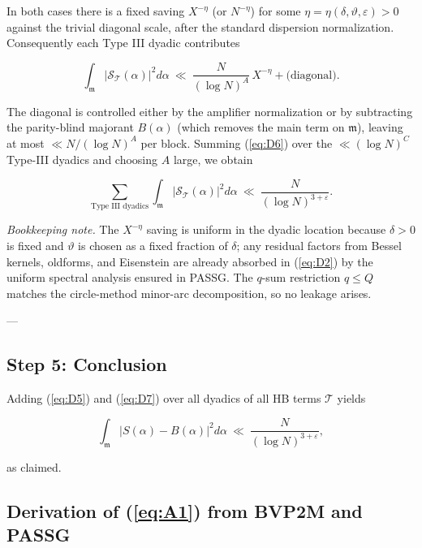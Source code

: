 \documentclass[11pt]{article}
\def\eqref#1{(\ref{#1})}%
\theoremstyle{definition}
\theoremstyle{remark}
\numberwithin{equation}{part}
\begin{document}
In both cases there is a fixed saving $X^{-\eta}$ (or $N^{-\eta}$) for some $\eta=\eta(\delta,\vartheta,\varepsilon)>0$ against the trivial diagonal scale, after the standard dispersion normalization. Consequently each Type III dyadic contributes

\begin{equation}\label{eq:D6}\int_{\mathfrak m}\big|\mathcal S_{\mathcal T}(\alpha)\big|^2 d\alpha\ \ll\ \frac{N}{(\log N)^{A}}\,X^{-\eta}+\text{(diagonal)}.\end{equation}

The diagonal is controlled either by the amplifier normalization or by subtracting the parity-blind majorant $B(\alpha)$ (which removes the main term on $\mathfrak m$), leaving at most $\ll N/(\log N)^A$ per block. Summing \eqref{eq:D6} over the $\ll(\log N)^C$ Type-III dyadics and choosing $A$ large, we obtain

\begin{equation}\label{eq:D7}\sum_{\text{Type III dyadics}}\int_{\mathfrak m}\big|\mathcal S_{\mathcal T}(\alpha)\big|^2 d\alpha\ \ll\ \frac{N}{(\log N)^{3+\varepsilon}}.\end{equation}

\emph{Bookkeeping note.} The $X^{-\eta}$ saving is uniform in the dyadic location because $\delta>0$ is fixed and $\vartheta$ is chosen as a fixed fraction of $\delta$; any residual factors from Bessel kernels, oldforms, and Eisenstein are already absorbed in \eqref{eq:D2} by the uniform spectral analysis ensured in PASSG. The $q$-sum restriction $q\le Q$ matches the circle-method minor-arc decomposition, so no leakage arises.

---

\subsection{Step 5: Conclusion}
Adding \eqref{eq:D5} and \eqref{eq:D7} over all dyadics of all HB terms $\mathcal T$ yields

$$
	\int_{\mathfrak m}\big|S(\alpha)-B(\alpha)\big|^2 d\alpha
	\ \ll\ \frac{N}{(\log N)^{3+\varepsilon}},
$$

as claimed.
\subsection{Derivation of \eqref{eq:A1} from BVP2M and PASSG}
\end{document}
